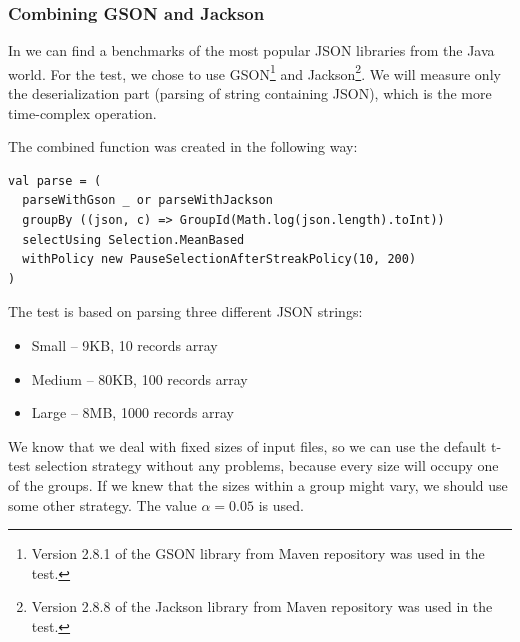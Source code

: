 \subsubsection{Combining GSON and Jackson}

In \cite{dreyfuss_ultimate_2015} we can find a benchmarks of the most popular JSON libraries from the Java world. For the test, we chose to use GSON\footnote{Version 2.8.1 of the GSON library from Maven repository was used in the test.} and Jackson\footnote{Version 2.8.8 of the Jackson library from Maven repository was used in the test.}. We will measure only the deserialization part (parsing of string containing JSON), which is the more time-complex operation. 

The combined function was created in the following way:
\lstset{style=Scala}
\begin{lstlisting}
val parse = (
  parseWithGson _ or parseWithJackson
  groupBy ((json, c) => GroupId(Math.log(json.length).toInt))
  selectUsing Selection.MeanBased
  withPolicy new PauseSelectionAfterStreakPolicy(10, 200)
)
\end{lstlisting}

The test is based on parsing three different JSON strings:

\begin{itemize}
	\item Small -- 9KB, 10 records array
	\item Medium -- 80KB, 100 records array
	\item Large -- 8MB, 1000 records array
\end{itemize}

We know that we deal with fixed sizes of input files, so we can use the default t-test selection strategy without any problems, because every size will occupy one of the groups. If we knew that the sizes within a group might vary, we should use some other strategy. The value $\alpha = 0.05$ is used.

